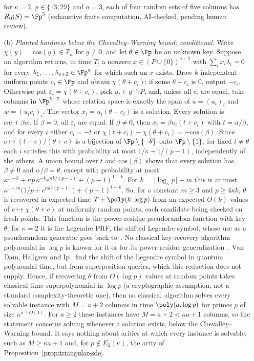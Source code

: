 \begin{remark}
for $\kappa=2$, $p\in\{13,29\}$ and $a=3$, each of four random sets of five columns has $R_0(S)=\Fp^3$ (exhaustive finite computation, AI-checked, pending human review).

\textup{(b)} \emph{Planted hardness below the Chevalley--Warning bound; conditional.} Write $\chi(y)=\mathrm{cos}(y)\in\mathbb{Z}_\kappa$ for $y\ne0$, and let $\theta\in\Fp$ be an unknown key. Suppose an algorithm returns, in time $T$, a nonzero $x\in(P\cup\{0\})^{a+2}$ with $\sum_i x_i\lambda_i=0$ for every $\lambda_1,\dots,\lambda_{a+2}\in\Fp^{a}$ for which such an $x$ exists. Draw $k$ independent uniform points $c_i\in\Fp$ and obtain $\chi(\theta+c_i)$; if some $\theta+c_i$ is $0$, output $-c_i$. Otherwise put $\varepsilon_i=\chi(\theta+c_i)$, pick $u_i\in g^{-\varepsilon_i}P$, and, unless all $c_i$ are equal, take columns in $\Fp^{k-2}$ whose relation space is exactly the span of $u=(u_i)_i$ and $w=(u_ic_i)_i$. The vector $x_i=u_i(\theta+c_i)$ is a solution. Every solution is $\alpha u+\beta w$. If $\beta=0$, all $\varepsilon_i$ are equal. If $\beta\ne0$, then $x_i=\beta u_i(t+c_i)$ with $t=\alpha/\beta$, and for every $i$ either $c_i=-t$ or $\chi(t+c_i)-\chi(\theta+c_i)=-\mathrm{cos}(\beta)$. Since $c\mapsto(t+c)/(\theta+c)$ is a bijection of $\Fp\setminus\{-\theta\}$ onto $\Fp\setminus\{1\}$, for fixed $t\ne \theta$ each $i$ satisfies this with probability at most $1/\kappa+1/(p-1)$, independently of the others. A union bound over $t$ and $\mathrm{cos}(\beta)$ shows that every solution has $\beta\ne0$ and $\alpha/\beta=\theta$, except with probability at most $\kappa^{1-k}+\kappa p\,\kappa^{-k}e^{\kappa k/(p-1)}+(p-1)^{1-k}$. For $k=\lceil\log_\kappa p\rceil+m$ this is at most $\kappa^{1-m}\bigl(1/p+e^{\kappa k/(p-1)}\bigr)+(p-1)^{1-k}$. So, for a constant $m\ge3$ and $p\ge4\kappa k$, $\theta$ is recovered in expected time $T+\poly(k,\log p)$ from an expected $O(k)$ values of $c\mapsto\chi(\theta+c)$ at uniformly random points, each candidate being checked on fresh points. This function is the power-residue pseudorandom function with key $\theta$; for $\kappa=2$ it is the Legendre PRF, the shifted Legendre symbol, whose use as a pseudorandom generator goes back to~\cite{Damgard1988}. No classical key-recovery algorithm polynomial in $\log p$ is known for it or for its power-residue generalization~\cite{BeullensBeyneUdovenkoVitto2020}. Van Dam, Hallgren and Ip~\cite{vanDamHallgrenIp2006} find the shift of the Legendre symbol in quantum polynomial time, but from superposition queries, which this reduction does not supply. Hence, if recovering $\theta$ from $O(\log p)$ values at random points takes classical time superpolynomial in $\log p$ (a cryptographic assumption, not a standard complexity-theoretic one), then no classical algorithm solves every solvable instance with $M=a+2$ columns in time $\poly(a,\log p)$ for primes $p$ of size $\kappa^{a+O(1)}$. For $a\ge2$ these instances have $M=a+2<\kappa a+1$ columns, so the statement concerns solving whenever a solution exists, below the Chevalley--Warning bound. It says nothing about arities at which every instance is solvable, such as $M\ge\kappa a+1$ and, for $p\notin E_2(\kappa)$, the arity of Proposition~\ref{prop:triangular-sde}.


\end{remark}
